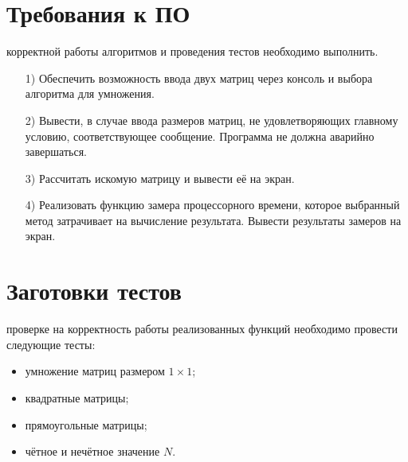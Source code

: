 \section{Требования к ПО}
 корректной работы алгоритмов и проведения тестов необходимо выполнить.
\begin{enumerate}
	\item[1)]Обеспечить возможность ввода двух матриц через консоль и выбора алгоритма для умножения.
	\item[2)]Вывести, в случае ввода размеров матриц, не удовлетворяющих главному условию, соответствующее сообщение. Программа не должна аварийно завершаться.
	\item[3)]Рассчитать искомую матрицу и вывести её на экран.
	\item[4)]Реализовать функцию замера процессорного времени, которое выбранный метод затрачивает на вычисление результата. Вывести результаты замеров на экран.
\end{enumerate}


\section{Заготовки тестов}
 проверке на корректность работы реализованных функций необходимо провести следующие тесты:
\begin{itemize}
	\item умножение матриц размером $1 \times 1$;
	\item квадратные матрицы;
	\item прямоугольные матрицы;
	\item чётное и нечётное значение $N$.
\end{itemize}